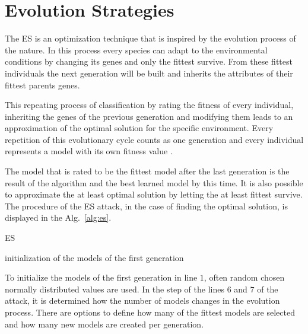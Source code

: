 \section{Evolution Strategies}
\label{sec:evolutionstrategies}

The \acf{ES} is an optimization technique that is inspired by the evolution process of the nature.
In this process every species can adapt to the environmental conditions by changing its genes and only the fittest survive.
From these fittest individuals the next generation will be built and inherits the attributes of their fittest parents genes. %

This repeating process of classification by rating the fitness of every individual, inheriting the genes of the previous generation and modifying them leads to an approximation of the optimal solution for the specific environment.
Every repetition of this evolutionary cycle counts as one generation and every individual represents a model with its own fitness value	\cite{Becker2015ThePUFs}. %

The model that is rated to be the fittest model after the last generation is the result of the algorithm and the best learned model by this time.
It is also possible to approximate the at least optimal solution by letting the at least fittest survive. %
The procedure of the \ac{ES} attack, in the case of finding the optimal solution, is displayed in the Alg.\ \ref{alg:es}.

\SetAlCapHSkip{0.2em}
\begin{algorithm}[H] %
\Indm
\SetAlgoLined
\caption{\acl{ES}}
\label{alg:es}
\Indp

initialization of the models of the first generation\\
\end{algorithm}

To initialize the models of the first generation in line $1$, often random chosen normally distributed values are used.
In the step of the lines $6$ and $7$ of the attack, it is determined how the number of models changes in the evolution process. %
There are options to define how many of the fittest models are selected and how many new models are created per generation.


